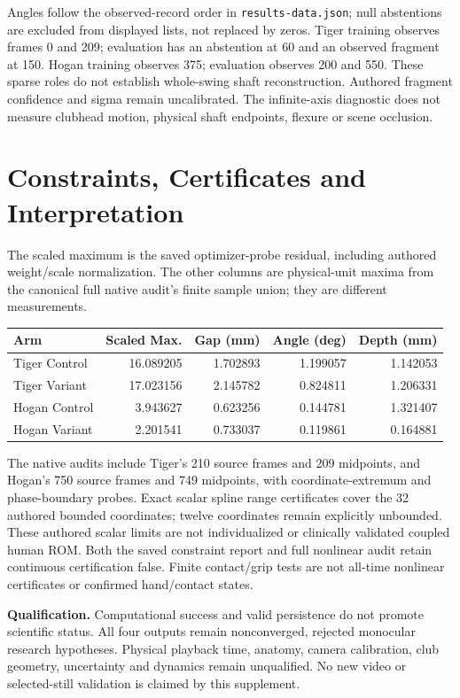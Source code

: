 \documentclass[11pt,letterpaper]{article}
\newcommand{\code}[1]{\nolinkurl{#1}}\newcommand{\hash}[1]{{\footnotesize\nolinkurl{#1}}}
\begin{document}
Angles follow the observed-record order in \code{results-data.json}; null abstentions are excluded from displayed lists, not replaced by zeros. Tiger training observes frames 0 and 209; evaluation has an abstention at 60 and an observed fragment at 150. Hogan training observes 375; evaluation observes 200 and 550. These sparse roles do not establish whole-swing shaft reconstruction. Authored fragment confidence and sigma remain uncalibrated. The infinite-axis diagnostic does not measure clubhead motion, physical shaft endpoints, flexure or scene occlusion.
\clearpage
\section{Constraints, Certificates and Interpretation}
The scaled maximum is the saved optimizer-probe residual, including authored weight/scale normalization. The other columns are physical-unit maxima from the canonical full native audit's finite sample union; they are different measurements.
\begin{center}\small
\begin{tabular}{@{}lrrrr@{}}\toprule
Arm & Scaled Max. & Gap (mm) & Angle (deg) & Depth (mm)\\\midrule
Tiger Control & 16.089205 & 1.702893 & 1.199057 & 1.142053\\
Tiger Variant & 17.023156 & 2.145782 & 0.824811 & 1.206331\\
Hogan Control & 3.943627 & 0.623256 & 0.144781 & 1.321407\\
Hogan Variant & 2.201541 & 0.733037 & 0.119861 & 0.164881\\
\bottomrule\end{tabular}
\end{center}

The native audits include Tiger's 210 source frames and 209 midpoints, and Hogan's 750 source frames and 749 midpoints, with coordinate-extremum and phase-boundary probes. Exact scalar spline range certificates cover the 32 authored bounded coordinates; twelve coordinates remain explicitly unbounded. These authored scalar limits are not individualized or clinically validated coupled human ROM. Both the saved constraint report and full nonlinear audit retain continuous certification false. Finite contact/grip tests are not all-time nonlinear certificates or confirmed hand/contact states.

\textbf{Qualification.} Computational success and valid persistence do not promote scientific status. All four outputs remain nonconverged, rejected monocular research hypotheses. Physical playback time, anatomy, camera calibration, club geometry, uncertainty and dynamics remain unqualified. No new video or selected-still validation is claimed by this supplement.
\end{document}

